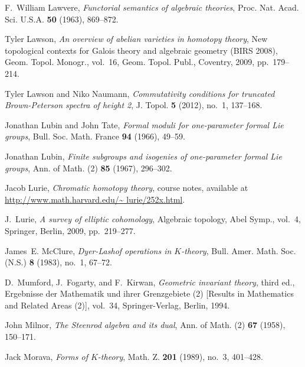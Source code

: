 \documentclass{gtpart}
\theoremstyle{definition}
\theoremstyle{remark}
\numberwithin{equation}{section}
\numberwithin{thm}{section}
\begin{document}
\begin{thebibliography}
F.~William Lawvere, \emph{Functorial semantics of algebraic theories}, Proc.
  Nat. Acad. Sci. U.S.A. \textbf{50} (1963), 869--872. 

Tyler Lawson, \emph{An overview of abelian varieties in homotopy theory}, New
  topological contexts for {G}alois theory and algebraic geometry ({BIRS}
  2008), Geom. Topol. Monogr., vol.~16, Geom. Topol. Publ., Coventry, 2009,
  pp.~179--214. 

Tyler Lawson and Niko Naumann, \emph{Commutativity conditions for truncated
  {B}rown-{P}eterson spectra of height 2}, J. Topol. \textbf{5} (2012), no.~1,
  137--168. 

Jonathan Lubin and John Tate, \emph{Formal moduli for one-parameter formal
  {L}ie groups}, Bull. Soc. Math. France \textbf{94} (1966), 49--59.

Jonathan Lubin, \emph{Finite subgroups and isogenies of one-parameter formal
  {L}ie groups}, Ann. of Math. (2) \textbf{85} (1967), 296--302. 

Jacob Lurie, \emph{Chromatic homotopy theory}, course notes, available at
  \href{http://www.math.harvard.edu/~lurie/252x.html}{http://www.\linebreak math.harvard.edu/\textasciitilde
  lurie/252x.html}.

J.~Lurie, \emph{A survey of elliptic cohomology}, Algebraic topology, Abel
  Symp., vol.~4, Springer, Berlin, 2009, pp.~219--277. 

James~E. McClure, \emph{Dyer-{L}ashof operations in {$K$}-theory}, Bull. Amer.
  Math. Soc. (N.S.) \textbf{8} (1983), no.~1, 67--72. 

D.~Mumford, J.~Fogarty, and F.~Kirwan, \emph{Geometric invariant theory}, third
  ed., Ergebnisse der Mathematik und ihrer Grenzgebiete (2) [Results in
  Mathematics and Related Areas (2)], vol.~34, Springer-Verlag, Berlin, 1994.

John Milnor, \emph{The {S}teenrod algebra and its dual}, Ann. of Math. (2)
  \textbf{67} (1958), 150--171. 

Jack Morava, \emph{Forms of {$K$}-theory}, Math. Z. \textbf{201} (1989), no.~3,
  401--428. 


\end{thebibliography}
\end{document}
